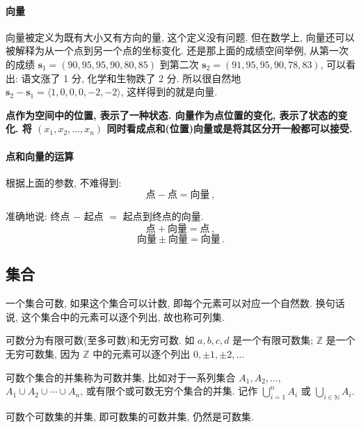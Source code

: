 \documentclass[UTF8]{ctexart}
\newcommand{\ve}[1]{\boldsymbol{\mathbf{#1}}}
\newcommand{\Z}{\mathbb Z}
\newcommand{\N}{\mathbb N}
\begin{document}
\paragraph{向量} 
向量被定义为既有大小又有方向的量, 这个定义没有问题. 但在数学上, 向量还可以被解释为从一个点到另一个点的坐标变化. 还是那上面的成绩空间举例, 从第一次的成绩 $ \ve s_1 = (90, 95, 95, 90, 80, 85) $ 到第二次 $ \ve s_2 = (91, 95, 95, 90, 78, 83) $, 可以看出: 语文涨了 1 分, 化学和生物跌了 2 分. 所以很自然地 $ \ve s_2 - \ve s_1 = \langle 1, 0, 0, 0, -2, -2 \rangle $, 这样得到的就是向量.

\begin{conclusion}
    \textbf{点作为空间中的位置, 表示了一种状态. 向量作为点位置的变化, 表示了状态的变化. 将 $ (x_1, x_2, \dots, x_n) $ 同时看成点和(位置)向量或是将其区分开一般都可以接受.}
\end{conclusion}


\paragraph{点和向量的运算}
根据上面的参数, 不难得到:
\[ \text{点} - \text{点} = \text{向量} \,,\]

准确地说: 终点 $ - $ 起点 $ = $ 起点到终点的向量.
\[ \text{点} + \text{向量} = \text{点} \,,\]
\[ \text{向量} \pm \text{向量} = \text{向量} \,.\]

\subsection{集合}
\begin{definition}
    一个集合可数, 如果这个集合可以计数, 即每个元素可以对应一个自然数. 换句话说, 这个集合中的元素可以逐个列出, 故也称可列集.
\end{definition}

可数分为有限可数(至多可数)和无穷可数. 如 $ {a, b, c, d} $ 是一个有限可数集; $ \Z $ 是一个无穷可数集, 因为 $ \Z $ 中的元素可以逐个列出 $ 0, \pm 1, \pm 2, \dots $

\begin{definition}
    可数个集合的并集称为可数并集, 比如对于一系列集合 $ A_1, A_2, \dots $, $ A_1 \cup A_2 \cup \cdots \cup A_n $, 或有限个或可数无穷个集合的并集. 记作 $\displaystyle \bigcup_{i = 1}^n A_i $ 或 $\displaystyle \bigcup_{i\in\N} A_i $.
\end{definition}

\begin{theorem}
    可数个可数集的并集, 即可数集的可数并集, 仍然是可数集.
\end{theorem}
\end{document}
